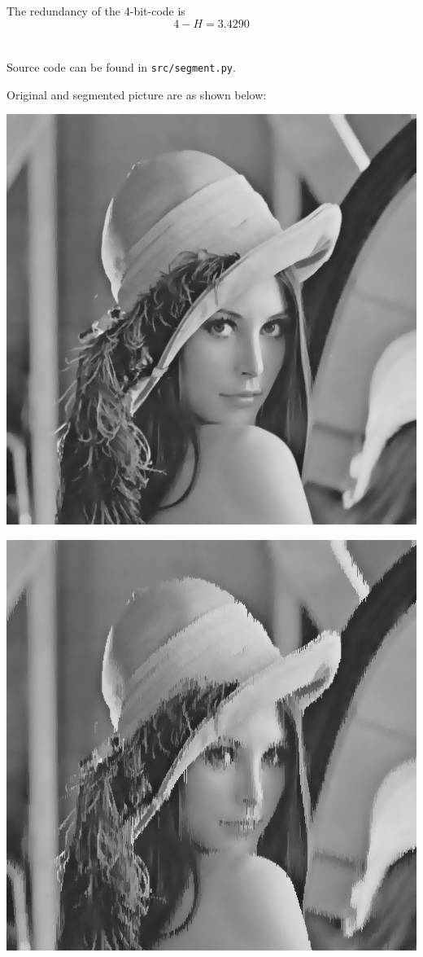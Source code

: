 \documentclass[a4paper,11pt]{article}
\begin{document}
\subsection{}
The redundancy of the 4-bit-code is
\[ 4 - H = 3.4290 \]

\section{}
Source code can be found in \texttt{src/segment.py}.

Original and segmented picture are as shown below:

\begin{center}
\includegraphics[width=.5\textwidth]{lenna}

\includegraphics[width=.5\textwidth]{segment}
\end{center}
\end{document}
